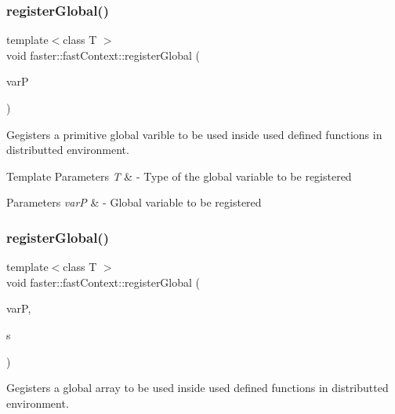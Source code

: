 \subsubsection{\texorpdfstring{register\+Global()}{registerGlobal()}\hspace{0.1cm}{\footnotesize\ttfamily [1/3]}}
{\footnotesize\ttfamily template$<$class T $>$ \\
void faster\+::fast\+Context\+::register\+Global (\begin{DoxyParamCaption}\item[{T $\ast$}]{varP }\end{DoxyParamCaption})}



Gegisters a primitive global varible to be used inside used defined functions in distributted environment. 


\begin{DoxyTemplParams}{Template Parameters}
{\em T} & -\/ Type of the global variable to be registered \\
\hline
\end{DoxyTemplParams}

\begin{DoxyParams}{Parameters}
{\em varP} & -\/ Global variable to be registered \\
\hline
\end{DoxyParams}
\hypertarget{classfaster_1_1fastContext_a569dc3296b036b0d159a35fd7eb37cbe}{}\label{classfaster_1_1fastContext_a569dc3296b036b0d159a35fd7eb37cbe} 
\subsubsection{\texorpdfstring{register\+Global()}{registerGlobal()}\hspace{0.1cm}{\footnotesize\ttfamily [2/3]}}
{\footnotesize\ttfamily template$<$class T $>$ \\
void faster\+::fast\+Context\+::register\+Global (\begin{DoxyParamCaption}\item[{T $\ast$$\ast$}]{varP,  }\item[{size\+\_\+t}]{s }\end{DoxyParamCaption})}



Gegisters a global array to be used inside used defined functions in distributted environment. 


